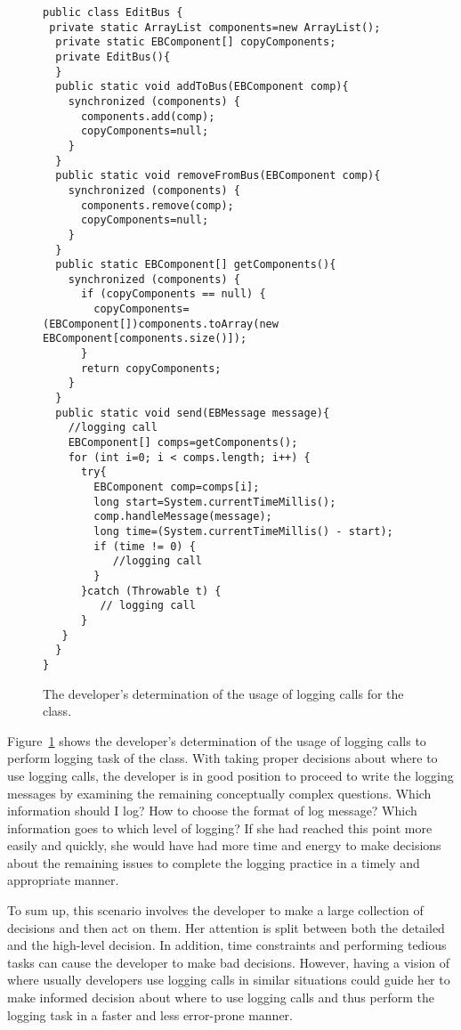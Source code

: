 \begin{figure}[H]
\def\baselinestretch{1}
\begin{lstlisting}
public class EditBus {
 private static ArrayList components=new ArrayList();
  private static EBComponent[] copyComponents;
  private EditBus(){
  }
  public static void addToBus(EBComponent comp){
    synchronized (components) {
      components.add(comp);
      copyComponents=null;
    }
  }
  public static void removeFromBus(EBComponent comp){
    synchronized (components) {
      components.remove(comp);
      copyComponents=null;
    }
  }
  public static EBComponent[] getComponents(){
    synchronized (components) {
      if (copyComponents == null) {
        copyComponents=(EBComponent[])components.toArray(new EBComponent[components.size()]);
      }
      return copyComponents;
    }
  }
  public static void send(EBMessage message){
    //logging call
    EBComponent[] comps=getComponents();
    for (int i=0; i < comps.length; i++) {
      try{
        EBComponent comp=comps[i];
        long start=System.currentTimeMillis();
        comp.handleMessage(message);
        long time=(System.currentTimeMillis() - start);
        if (time != 0) {
           //logging call
        }
      }catch (Throwable t) {
         // logging call
      }
   }
  }
}
\end{lstlisting}
\caption{The developer’s determination of the usage of logging calls for the  class.\label{ch2-ex-logged}}
\end{figure}

Figure~\ref{ch2-ex-logged} shows the developer’s determination of the usage of logging calls to perform logging task of the  class. With taking proper decisions about where to use logging calls, the developer is in good position to proceed to write the logging messages by examining the remaining conceptually complex questions. Which information should I log? How to choose the format of log message? Which information goes to which level of logging? If she had reached this point more easily and quickly, she would have had more time and energy to make decisions about the remaining issues to complete the logging practice in a timely and appropriate manner.


To sum up, this scenario involves the developer to make a large collection of decisions and then act on them. Her attention is split between both the detailed and the high-level decision. In addition, time constraints and performing tedious tasks can cause the developer to make bad decisions. However, having a vision of where usually developers use logging calls in similar situations could guide her to make informed decision about where to use logging calls and thus perform the logging task in a faster and less error-prone manner.


